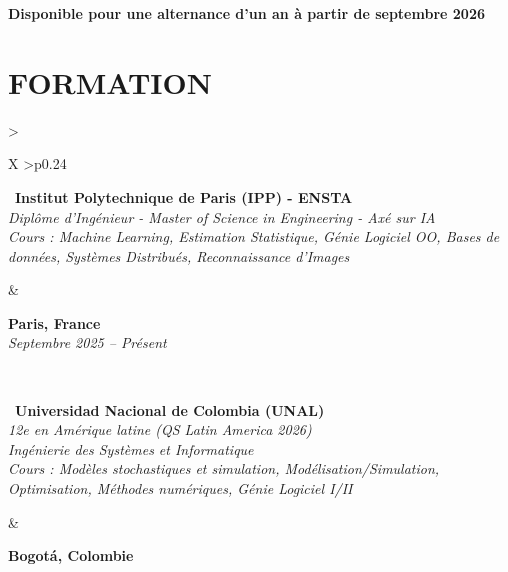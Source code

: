 \documentclass[letterpaper,10pt]{article}
\begin{document}
\vspace{0.15cm}

\textbf{Disponible pour une alternance d'un an à partir de septembre 2026}


\vspace{0.02cm}

\section{\textcolor{mydarkgreen}{\textbf{FORMATION}}}

\begin{tabularx}{\textwidth}{>{\raggedright\arraybackslash}X >{\raggedleft\arraybackslash}p{0.24\textwidth}}
  \begin{minipage}[t]{\linewidth}\raggedright
  \textbullet\ \textbf{Institut Polytechnique de Paris (IPP) - ENSTA}\\
  \textit{\footnotesize Diplôme d'Ingénieur - Master of Science in Engineering - Axé sur IA}\\
  \textit{\footnotesize Cours : Machine Learning, Estimation Statistique, Génie Logiciel OO, Bases de données, Systèmes Distribués, Reconnaissance d'Images}
  \end{minipage}
  &
  \begin{minipage}[t]{\linewidth}\raggedleft
  \textbf{Paris, France}\\
  {\footnotesize\textit{Septembre 2025 -- Présent}}
  \end{minipage}
  \\
  \begin{minipage}[t]{\linewidth}
  \textbullet\ \textbf{Universidad Nacional de Colombia (UNAL)}\\
  \textit{\footnotesize 12e en Amérique latine (QS Latin America 2026)}\\
  \textit{\footnotesize Ingénierie des Systèmes et Informatique}\\
  \textit{\footnotesize Cours : Modèles stochastiques et simulation, Modélisation/Simulation, Optimisation, Méthodes numériques, Génie Logiciel I/II}
  \end{minipage}
  &
  \begin{minipage}[t]{\linewidth}\raggedleft
  \textbf{Bogotá, Colombie}\\

\end{minipage}
\end{tabularx}
\end{document}

